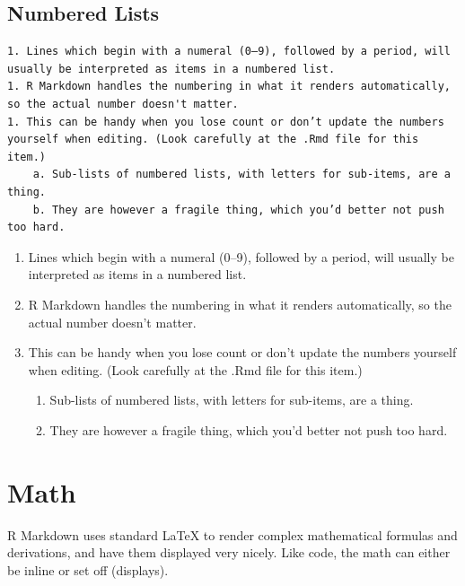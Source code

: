 \documentclass[]{book}
\providecommand{\tightlist}{%
  \setlength{\itemsep}{0pt}\setlength{\parskip}{0pt}}
\theoremstyle{definition}
\theoremstyle{definition}
\theoremstyle{definition}
\theoremstyle{remark}
\begin{document}
\hypertarget{numbered-lists}{%
\subsection{Numbered Lists}\label{numbered-lists}}

\begin{verbatim}
1. Lines which begin with a numeral (0–9), followed by a period, will usually be interpreted as items in a numbered list.
1. R Markdown handles the numbering in what it renders automatically, so the actual number doesn't matter.
1. This can be handy when you lose count or don’t update the numbers yourself when editing. (Look carefully at the .Rmd file for this item.)
    a. Sub-lists of numbered lists, with letters for sub-items, are a thing.
    b. They are however a fragile thing, which you’d better not push too hard.
\end{verbatim}

\begin{enumerate}
\def\labelenumi{\arabic{enumi}.}
\tightlist
\item
  Lines which begin with a numeral (0--9), followed by a period, will
  usually be interpreted as items in a numbered list.
\item
  R Markdown handles the numbering in what it renders automatically, so
  the actual number doesn't matter.
\item
  This can be handy when you lose count or don't update the numbers
  yourself when editing. (Look carefully at the .Rmd file for this
  item.)

  \begin{enumerate}
  \def\labelenumii{\alph{enumii}.}
  \tightlist
  \item
    Sub-lists of numbered lists, with letters for sub-items, are a
    thing.
  \item
    They are however a fragile thing, which you'd better not push too
    hard.
  \end{enumerate}
\end{enumerate}

\hypertarget{math}{%
\section{Math}\label{math}}

R Markdown uses standard LaTeX to render complex mathematical formulas
and derivations, and have them displayed very nicely. Like code, the
math can either be inline or set off (displays).
\end{document}
